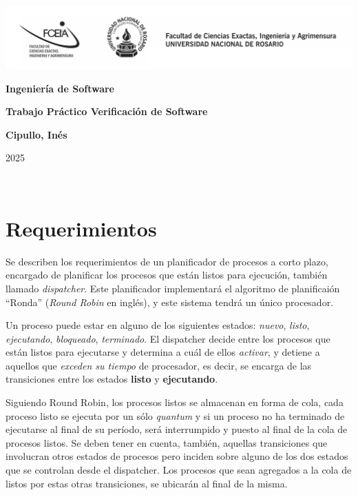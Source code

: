 \documentclass{article}
\begin{document}
\begin{titlepage}
    \hspace{-3.2cm}\includegraphics[scale= 0.48]{header.png}
    \begin{center}
        \vfill
            \noindent\textbf{\Huge Ingeniería de Software}\par
            \vspace{.5cm}
            \noindent\textbf{\Huge Trabajo Práctico Verificación de Software}\par
            \vspace{.5cm}
        \vfill
        \vspace{.5cm}
        \noindent \textbf{\Large Cipullo, Inés}\par
 
        \vfill
        \noindent\large 2025
    \end{center}
\end{titlepage}
\ 

\section{Requerimientos}

Se describen los requerimientos de un planificador de procesos a corto plazo, encargado de planificar los procesos que están listos para ejecución, también llamado \textit{dispatcher}. Este planificador implementará el algoritmo de planificaión ``Ronda'' (\textit{Round Robin} en inglés), y este sistema tendrá un único procesador.

Un proceso puede estar en alguno de los siguientes estados: \textit{nuevo}, \textit{listo}, \textit{ejecutando}, \textit{bloqueado}, \textit{terminado}. El dispatcher decide entre los procesos que están listos para ejecutarse y determina a cuál de ellos \textit{activar}, y detiene a aquellos que \textit{exceden su tiempo} de procesador, es decir, se encarga de las transiciones entre los estados \textbf{listo} y \textbf{ejecutando}. 

Siguiendo Round Robin, los procesos listos se almacenan en forma de cola, cada proceso listo se ejecuta por un sólo \textit{quantum} y si un proceso no ha terminado de ejecutarse al final de su período, será interrumpido y puesto al final de la cola de procesos listos.
Se deben tener en cuenta, también, aquellas transiciones que involucran otros estados de procesos pero inciden sobre alguno de los dos estados que se controlan desde el dispatcher. Los procesos que sean agregados a la cola de listos por estas otras transiciones, se ubicarán al final de la misma.
\end{document}
